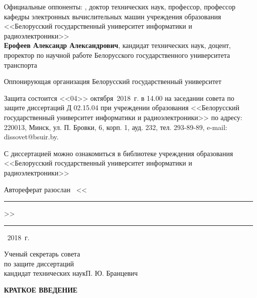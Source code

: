 \documentclass{thesisby}
\begin{document}
\vspace*{\fill} \noindent \hangindent=70mm  
    Официальные оппоненты: \hspace{10mm}{\bf Татур Михаил Михайлович}, доктор технических наук, профессор, профессор кафедры электронных вычислительных машин учреждения образования <<Белорусский государственный университет информатики и радиоэлектроники>> \\ [5pt]
    {\bf Ерофеев Александр Александрович}, кандидат технических наук, доцент, проректор по научной работе Белорусского государственного университета транспорта



\vspace*{\fill} \noindent \hangindent=66mm  Оппонирующая
организация \hspace{4mm} Белорусский государственный университет


\vspace*{\fill} \noindent Защита состоится <<04>> октября~2018~г. в 14.00
на заседании совета по защите диссертаций Д 02.15.04 при учреждении образования <<Белорусский государственный университет информатики и радиоэлектроники>> по адресу: 220013, Минск, ул. П. Бровки, 6, корп. 1, ауд. 232, тел. 293-89-89, e-mail: dissovet@bsuir.by.


\vspace*{\fill} \noindent
С диссертацией можно ознакомиться в библиотеке учреждения образования <<Белорусский государственный университет информатики и радиоэлектроники>>

\vspace*{\fill} \noindent
Автореферат разослан~
<<\rule{10mm}{0.4pt}>>~\rule{30mm}{0.4pt}~2018~г.

\vspace*{\fill}

\noindent Ученый секретарь совета\\ по защите диссертаций\\ кандидат
технических наук\hfill П. Ю. Бранцевич

\vspace*{\fill}

\vspace*{\fill}

\newpage
\setcounter{page}{1}

\centerline{\bf КРАТКОЕ ВВЕДЕНИЕ}

\parindent=1cm

\medskip

\end{document}
